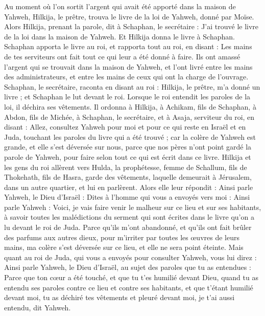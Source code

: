 \begin{multicols}{2}
Au moment où l'on sortit l'argent qui avait été apporté dans la maison de Yahweh, Hilkija, le prêtre, trouva le livre de la loi de Yahweh, donné par Moïse.
Alors Hilkija, prenant la parole, dit à Schaphan, le secrétaire : J'ai trouvé le livre de la loi dans la maison de Yahweh. Et Hilkija donna le livre à Schaphan.
Schaphan apporta le livre au roi, et rapporta tout au roi, en disant : Les mains de tes serviteurs ont fait tout ce qui leur a été donné à faire.
Ils ont amassé l'argent qui se trouvait dans la maison de Yahweh, et l'ont livré entre les mains des administrateurs, et entre les mains de ceux qui ont la charge de l'ouvrage.
Schaphan, le secrétaire, raconta en disant au roi : Hilkija, le prêtre, m'a donné un livre ; et Schaphan le lut devant le roi.
Lorsque le roi entendit les paroles de la loi, il déchira ses vêtements.
Il ordonna à Hilkija, à Achikam, fils de Schaphan, à Abdon, fils de Michée, à Schaphan, le secrétaire, et à Asaja, serviteur du roi, en disant :
Allez, consultez Yahweh pour moi et pour ce qui reste en Israël et en Juda, touchant les paroles du livre qui a été trouvé ; car la colère de Yahweh est grande, et elle s'est déversée sur nous, parce que nos pères n'ont point gardé la parole de Yahweh, pour faire selon tout ce qui est écrit dans ce livre.
Hilkija et les gens du roi allèrent vers Hulda, la prophétesse, femme de Schallum, fils de Thokehath, fils de Hasra, garde des vêtements, laquelle demeurait à Jérusalem, dans un autre quartier, et lui en parlèrent.
Alors elle leur répondit : Ainsi parle Yahweh, le Dieu d'Israël : Dites à l'homme qui vous a envoyés vers moi :
Ainsi parle Yahweh : Voici, je vais faire venir le malheur sur ce lieu et sur ses habitants, à savoir toutes les malédictions du serment qui sont écrites dans le livre qu'on a lu devant le roi de Juda.
Parce qu'ils m'ont abandonné, et qu'ils ont fait brûler des parfums aux autres dieux, pour m'irriter par toutes les œuvres de leurs mains, ma colère s'est déversée sur ce lieu, et elle ne sera point éteinte.
Mais quant au roi de Juda, qui vous a envoyés pour consulter Yahweh, vous lui direz : Ainsi parle Yahweh, le Dieu d'Israël, au sujet des paroles que tu as entendues :
Parce que ton cœur a été touché, et que tu t'es humilié devant Dieu, quand tu as entendu ses paroles contre ce lieu et contre ses habitants, et que t'étant humilié devant moi, tu as déchiré tes vêtements et pleuré devant moi, je t'ai aussi entendu, dit Yahweh.

\end{multicols}
